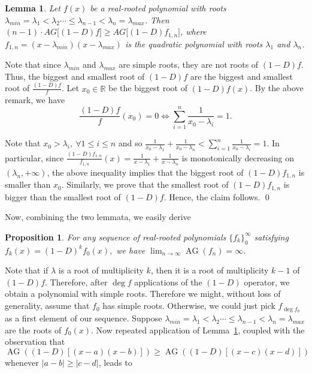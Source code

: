 \documentclass[11pt]{article}
\DeclareMathOperator{\AG}{AG}
\newtheorem{lemma}[theorem]{Lemma}
\newtheorem{proposition}[theorem]{Proposition}
\begin{document}
\begin{lemma}
\label{degree two - slowest movement}
Let $f(x)$ be a real-rooted polynomial with roots $\lambda_{min}=\lambda_1 < \lambda_2 \cdots \leq \lambda_{n-1} < \lambda_n = \lambda_{max}$. Then $(n-1) \cdot AG\big[(1-D)f\big] \geq AG\big[(1-D)f_{1,n}\big]$, where $f_{1,n} = (x - \lambda_{min})(x - \lambda_{max})$ is the quadratic polynomial with roots $\lambda_1$ and $\lambda_n$.
\end{lemma}
\proof Note that since $\lambda_{min}$ and $\lambda_{max}$ are simple roots, they are not roots of $(1-D)f$. Thus, the biggest and smallest root of $(1-D)f$ are the biggest and smallest root of $\frac{(1-D)f}{f}$. Let $x_0\in\mathbb{R}$ be the biggest root of $(1-D)f(x)$. By the above remark, we have
\[\frac{(1-D)f}{f}(x_0) = 0 \Leftrightarrow \sum_{i=1}^n \frac{1}{x_0 - \lambda_i} = 1.\]

Note that $x_0 > \lambda_i,~\forall 1\leq i \leq n$ and so $\frac{1}{x_0 - \lambda_1} + \frac{1}{x_0 - \lambda_n} < \sum_{i=1}^n \frac{1}{x_0 - \lambda_i} = 1.$ In particular, since $\frac{(1-D)f_{1,n}}{f_{1,n}}(x) = \frac{1}{x - \lambda_1} + \frac{1}{x - \lambda_n}$ is monotonically decreasing on $(\lambda_n, +\infty)$, the above inequality implies that the biggest root of $(1-D)f_{1,n}$ is smaller than $x_0$. Similarly, we prove that the smallest root of $(1-D)f_{1,n}$ is bigger than the smallest root of $(1-D)f$. Hence, the claim follows. \qed

Now, combining the two lemmata, we easily derive

\begin{proposition}For any sequence of real-rooted polynomials $\{f_k\}_0^{\infty}$ satisfying $f_{k}(x) = (1-D)^k f_{0}(x),$ we have $\lim_{n\to \infty} \AG(f_n) =  \infty.$
\end{proposition}
\label{avg gap goes to infty}
\proof Note that if $\lambda$ is a root of multiplicity $k$, then it is a root of multiplicity $k-1$ of $(1-D)f$. Therefore, after $\deg f$ applications of the $(1-D)$ operator, we obtain a polynomial with simple roots. Therefore we might, without loss of generality, assume that $f_0$ has simple roots. Otherwise, we could just pick $f_{\deg f_0}$ as a first element of our sequence. Suppose $\lambda_{min}=\lambda_1 < \lambda_2 \cdots \leq \lambda_{n-1} < \lambda_n = \lambda_{max}$ are the roots of $f_0(x)$. Now repeated application of Lemma~\ref{degree two - slowest movement}, coupled with the observation that $\AG((1-D)[(x-a)(x-b)]) \geq \AG((1-D)[(x-c)(x-d)])$ whenever $|a-b|\geq|c-d|$, leads to
\end{document}
